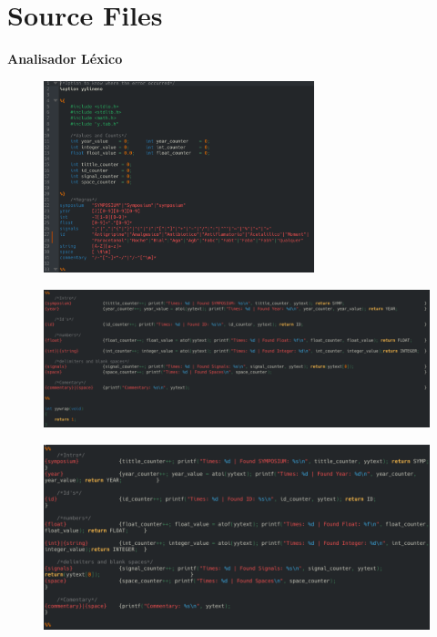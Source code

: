 \documentclass{article}
\begin{document}
\pagebreak


\appendix
\section{Source Files}
\large\textbf{Analisador Léxico}

\vspace{2cm}


\begin{figure}[!h]
\centering
\includegraphics[width=0.7\textwidth]{AL1.png}
\end{figure}

\begin{figure}[!h]
\centering
\includegraphics[width=1\textwidth]{AL2.png}
\end{figure}

\begin{figure}[!h]
\centering
\includegraphics[width=1\textwidth]{AL3.png}
\end{figure}
\end{document}
